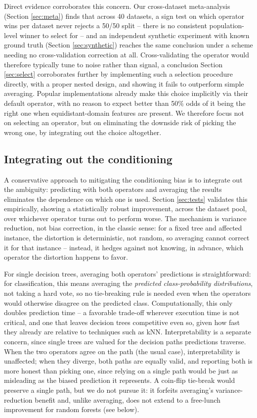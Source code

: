 \documentclass[5p,twocolumn,authoryear]{elsarticle}
\theoremstyle{plain}%
\theoremstyle{remark}%
\theoremstyle{definition}%
\begin{document}
Direct evidence corroborates this concern. Our cross-dataset meta-analysis (Section \ref{sec:meta}) finds that across 40 datasets, a sign test on which operator wins per dataset never rejects a 50/50 split -- there is no consistent population-level winner to select for -- and an independent synthetic experiment with known ground truth (Section \ref{sec:synthetic}) reaches the same conclusion under a scheme needing no cross-validation correction at all. Cross-validating the operator would therefore typically tune to noise rather than signal, a conclusion Section \ref{sec:select} corroborates further by implementing such a selection procedure directly, with a proper nested design, and showing it fails to outperform simple averaging. Popular implementations already make this choice implicitly via their default operator, with no reason to expect better than 50\% odds of it being the right one when equidistant-domain features are present. We therefore focus not on selecting an operator, but on eliminating the downside risk of picking the wrong one, by integrating out the choice altogether.

\subsection{Integrating out the conditioning}
\label{sec:integrate}

A conservative approach to mitigating the conditioning bias is to integrate out the ambiguity: predicting with both operators and averaging the results eliminates the dependence on which one is used. Section \ref{sec:tests} validates this empirically, showing a statistically robust improvement, across the dataset pool, over whichever operator turns out to perform worse. The mechanism is variance reduction, not bias correction, in the classic sense: for a fixed tree and affected instance, the distortion is deterministic, not random, so averaging cannot correct it for that instance -- instead, it hedges against not knowing, in advance, which operator the distortion happens to favor.

For single decision trees, averaging both operators' predictions is straightforward: for classification, this means averaging the \emph{predicted class-probability distributions}, not taking a hard vote, so no tie-breaking rule is needed even when the operators would otherwise disagree on the predicted class. Computationally, this only doubles prediction time -- a favorable trade-off wherever execution time is not critical, and one that leaves decision trees competitive even so, given how fast they already are relative to techniques such as kNN.
Interpretability is a separate concern, since single trees are valued for the decision paths predictions traverse. When the two operators agree on the path (the usual case), interpretability is unaffected; when they diverge, both paths are equally valid, and reporting both is more honest than picking one, since relying on a single path would be just as misleading as the biased prediction it represents. A coin-flip tie-break would preserve a single path, but we do not pursue it: it forfeits averaging's variance-reduction benefit and, unlike averaging, does not extend to a free-lunch improvement for random forests (see below).
\end{document}

